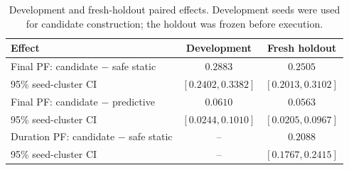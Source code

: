 \begin{table}[t]
\caption{Development and fresh-holdout paired effects. Development seeds were used for candidate construction; the holdout was frozen before execution.}
\label{tab:dev-holdout}
\centering
\footnotesize
\setlength{\tabcolsep}{3.1pt}
\renewcommand{\arraystretch}{1.08}
\begin{tabular}{@{}lcc@{}}
\toprule
Effect & Development & Fresh holdout\\
\midrule
Final PF: candidate $-$ safe static &
$0.2883$ & $0.2505$\\
95\% seed-cluster CI &
$[0.2402,0.3382]$ & $[0.2013,0.3102]$\\
Final PF: candidate $-$ predictive &
$0.0610$ & $0.0563$\\
95\% seed-cluster CI &
$[0.0244,0.1010]$ & $[0.0205,0.0967]$\\
Duration PF: candidate $-$ safe static &
-- & $0.2088$\\
95\% seed-cluster CI &
-- & $[0.1767,0.2415]$\\
\bottomrule
\end{tabular}
\end{table}
